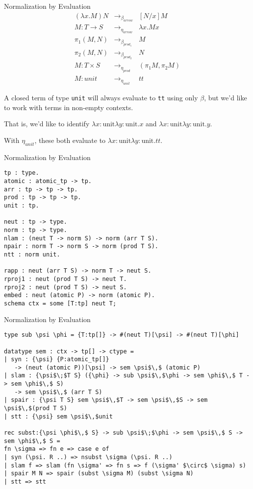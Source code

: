 \documentclass{beamer}
\begin{document}
\begin{frame}[fragile]{Normalization by Evaluation}
\begin{align*}
(\lambda x. M) N &\longrightarrow_{\beta_{arrow}}& [N/x]M\\
M : T \rightarrow S &\longrightarrow_{\eta_{arrow}}& \lambda x. M x\\
\pi_1 (M , N) &\longrightarrow_{\beta_{prod_1}}& M\\
\pi_2 (M , N) &\longrightarrow_{\beta_{prod_2}}& N\\
M : T \times S &\longrightarrow_{\eta_{prod}}& (\pi_1 M, \pi_2 M)\\
M : unit &\longrightarrow_{\eta_{unit}}& tt
\end{align*}

A closed term of type {\tt unit} will always evaluate to {\tt tt} using only $\beta$, but we'd like to work with terms in non-empty contexts.

That is, we'd like to identify $\lambda x:\text{unit} \lambda y:\text{unit}. x$ and $\lambda x:\text{unit} \lambda y:\text{unit}. y$.

With $\eta_{unit}$, these both evaluate to $\lambda x:\text{unit} \lambda y:\text{unit}. tt$.
\end{frame}

\begin{frame}[fragile]{Normalization by Evaluation}
\begin{lstlisting}
tp : type.
atomic : atomic_tp -> tp.
arr : tp -> tp -> tp.
prod : tp -> tp -> tp.
unit : tp.

neut : tp -> type.
norm : tp -> type.
nlam : (neut T -> norm S) -> norm (arr T S).
npair : norm T -> norm S -> norm (prod T S).
ntt : norm unit.

rapp : neut (arr T S) -> norm T -> neut S.
rproj1 : neut (prod T S) -> neut T.
rproj2 : neut (prod T S) -> neut S.
embed : neut (atomic P) -> norm (atomic P).
schema ctx = some [T:tp] neut T;
\end{lstlisting}
\end{frame}

\begin{frame}[fragile]{Normalization by Evaluation}

\begin{lstlisting}
type sub \psi \phi = {T:tp[]} -> #(neut T)[\psi] -> #(neut T)[\phi]

datatype sem : ctx -> tp[] -> ctype =
| syn : {\psi} {P:atomic_tp[]}
   -> (neut (atomic P))[\psi] -> sem \psi$\,$ (atomic P)
| slam : {\psi$\;$T S} ({\phi} -> sub \psi$\,$\phi -> sem \phi$\,$ T -> sem \phi$\,$ S)
   -> sem \psi$\,$ (arr T S)
| spair : {\psi T S} sem \psi$\,$T -> sem \psi$\,$S -> sem \psi$\,$(prod T S)
| stt : {\psi} sem \psi$\,$unit

rec subst:{\psi \phi$\,$ S} -> sub \psi$\;$\phi -> sem \psi$\,$ S -> sem \phi$\,$ S =
fn \sigma => fn e => case e of
| syn (\psi. R ..) => nsubst \sigma (\psi. R ..)
| slam f => slam (fn \sigma' => fn s => f (\sigma' $\circ$ \sigma) s)
| spair M N => spair (subst \sigma M) (subst \sigma N)
| stt => stt
\end{lstlisting}
\end{frame}
\end{document}

